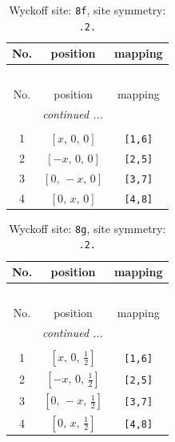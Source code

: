 \documentclass[fleqn,8pt]{jsarticle}
\begin{document}
\renewcommand{\arraystretch}{1.2}
\begin{longtable}{ccc}
\caption{Wyckoff site: {\tt 8f}, site symmetry: {\tt .2.}}
 \\
 \hline \hline
No. & position & mapping \\ \hline \endfirsthead

\multicolumn{2}{l}{\tablename\ \thetable{}} \\
 \hline \hline
No. & position & mapping \\ \hline \endhead

 \hline \hline
\multicolumn{2}{r}{\footnotesize\it continued ...} \\ \endfoot

 \hline \hline
\multicolumn{2}{r}{} \\ \endlastfoot

1 & $\left[ x,\, 0,\, 0 \right]$ & {\tt [1,6]} \\ \hline
2 & $\left[ - x,\, 0,\, 0 \right]$ & {\tt [2,5]} \\ \hline
3 & $\left[ 0,\, - x,\, 0 \right]$ & {\tt [3,7]} \\ \hline
4 & $\left[ 0,\, x,\, 0 \right]$ & {\tt [4,8]} \\
\end{longtable}
\renewcommand{\arraystretch}{1.2}
\begin{longtable}{ccc}
\caption{Wyckoff site: {\tt 8g}, site symmetry: {\tt .2.}}
 \\
 \hline \hline
No. & position & mapping \\ \hline \endfirsthead

\multicolumn{2}{l}{\tablename\ \thetable{}} \\
 \hline \hline
No. & position & mapping \\ \hline \endhead

 \hline \hline
\multicolumn{2}{r}{\footnotesize\it continued ...} \\ \endfoot

 \hline \hline
\multicolumn{2}{r}{} \\ \endlastfoot

1 & $\left[ x,\, 0,\, \frac{1}{2} \right]$ & {\tt [1,6]} \\ \hline
2 & $\left[ - x,\, 0,\, \frac{1}{2} \right]$ & {\tt [2,5]} \\ \hline
3 & $\left[ 0,\, - x,\, \frac{1}{2} \right]$ & {\tt [3,7]} \\ \hline
4 & $\left[ 0,\, x,\, \frac{1}{2} \right]$ & {\tt [4,8]} \\
\end{longtable}
\end{document}
